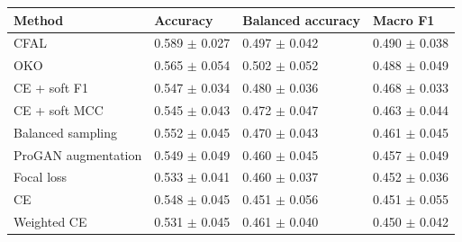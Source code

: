 \begin{tabular}{llll}
\toprule
Method & Accuracy & Balanced accuracy & Macro F1\\
\midrule
CFAL & \num{0.589} $\pm$ \num{0.027} & \num{0.497} $\pm$ \num{0.042} & \num{0.490} $\pm$ \num{0.038}\\
OKO & \num{0.565} $\pm$ \num{0.054} & \num{0.502} $\pm$ \num{0.052} & \num{0.488} $\pm$ \num{0.049}\\
CE + soft F1 & \num{0.547} $\pm$ \num{0.034} & \num{0.480} $\pm$ \num{0.036} & \num{0.468} $\pm$ \num{0.033}\\
CE + soft MCC & \num{0.545} $\pm$ \num{0.043} & \num{0.472} $\pm$ \num{0.047} & \num{0.463} $\pm$ \num{0.044}\\
Balanced sampling & \num{0.552} $\pm$ \num{0.045} & \num{0.470} $\pm$ \num{0.043} & \num{0.461} $\pm$ \num{0.045}\\
ProGAN augmentation & \num{0.549} $\pm$ \num{0.049} & \num{0.460} $\pm$ \num{0.045} & \num{0.457} $\pm$ \num{0.049}\\
Focal loss & \num{0.533} $\pm$ \num{0.041} & \num{0.460} $\pm$ \num{0.037} & \num{0.452} $\pm$ \num{0.036}\\
CE & \num{0.548} $\pm$ \num{0.045} & \num{0.451} $\pm$ \num{0.056} & \num{0.451} $\pm$ \num{0.055}\\
Weighted CE & \num{0.531} $\pm$ \num{0.045} & \num{0.461} $\pm$ \num{0.040} & \num{0.450} $\pm$ \num{0.042}\\
\bottomrule
\end{tabular}
